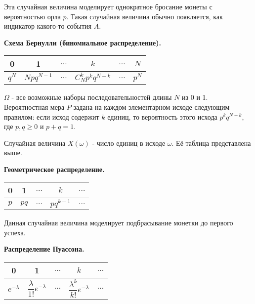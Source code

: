 \documentclass[a4paper]{article}
\begin{document}
\begin{colloq}
\begin{example}
   	Эта случайная величина моделирует однократное бросание монеты с вероятностью орла $p$. Такая случайная величина обычно появляется, как индикатор какого-то события $A$.
   	\end{example}
   
   \begin{example}
   	
   	\textbf{Схема Бернулли (биномиальное распределение).}
   	
   	\begin{tabular}{ | c | c | c | c | c | c |}
   		\hline
   		0 & 1 & $\dots$ & $k$ & $\dots$ & $N$ \\ \hline
   		$q^N$ & $Npq^{N-1}$ & $\dots$ & $C_N^k p^k q^{N-k}$ & $\dots$ & $p^N$ \\
   		\hline
   	\end{tabular}
   	
   	$\Omega$ - все возможные наборы последовательностей длины $N$ из 0 и 1. Вероятностная мера $P$ задана на каждом элементарном исходе следующим правилом: если исход содержит $k$ единиц, то вероятность этого исхода $p^k	q^{N-k}$, где $p, q \geqslant 0$ и $p + q = 1$.
   	
   	Случайная величина $X(\omega)$ - число единиц в исходе $\omega$. Её таблица представлена выше.
   \end{example}

	\begin{example}
		
		\textbf{Геометрическое распределение.}
		
		\begin{tabular}{ | c | c | c | c | c |}
			\hline
			0 & 1 & $\dots$ & $k$ & $\dots$ \\ \hline
			$p$ & $pq$ & $\dots$ & $p q^{k-1}$ & $\dots$ \\
			\hline
		\end{tabular}
		
		Данная случайная величина моделирует подбрасывание монетки до первого успеха.
	\end{example}

	\begin{example}
		
		\textbf{Распределение Пуассона.}
		
		\begin{tabular}{ | c | c | c | c | c |}
			\hline
			0 & 1 & $\dots$ & $k$ & $\dots$ \\ \hline
			$e^{-\lambda}$ & $\dfrac{\lambda}{1!} e^{-\lambda}$ & $\dots$ & $\dfrac{\lambda^k}{k!} e^{-\lambda}$ & $\dots$ \\
			\hline
		\end{tabular}
	

\end{example}
\end{colloq}
\end{document}

